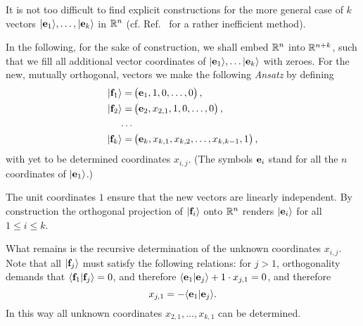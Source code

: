 \documentclass[%
 preprint,
 showpacs,
 showkeys,
 preprintnumbers,
 amsmath,amssymb,
 aps,
  pra,
  longbibliography,
 ]{revtex4-1}
\begin{document}

It is not too difficult to find explicit constructions for the more general
case of $k$ vectors $\vert {\bf e}_1 \rangle , \ldots, \vert {\bf e}_k \rangle
$ in ${\Bbb R}^n$ (cf. Ref.~\cite{svozil-2016-vector} for a rather inefficient
method).

In the following, for the sake of construction, we shall embed ${\Bbb R}^n$
into ${\Bbb R}^{n+k}$, such that we fill all additional vector coordinates of
$\vert {\bf e}_1 \rangle , \ldots \vert {\bf e}_k \rangle $ with zeroes. For
the new, mutually orthogonal, vectors we make the following {\it Ansatz} by
defining
\begin{equation}\label{ansatz}
\begin{aligned}
\vert {\bf f}_1 \rangle =& \begin{pmatrix}{\bf e}_1, 1, 0, \ldots, 0 \end{pmatrix}, \\
\vert {\bf f}_2 \rangle =& \begin{pmatrix}{\bf e}_2, x_{2,1}, 1, 0,\ldots, 0\end{pmatrix},\\
\ldots& \\
\vert {\bf f}_k \rangle =& \begin{pmatrix}{\bf e}_k, x_{k,1}, x_{k,2},\ldots, x_{k,k-1}, 1\end{pmatrix},
\end{aligned}%
\end{equation}
with yet to be determined coordinates $x_{i,j}$.
(The symbols ${\bf e}_i$ stand for all the $n$ coordinates of $\vert {\bf e}_1 \rangle$.)

The unit coordinates $1$ ensure that the new vectors are linearly
independent. By construction the orthogonal projection of $\vert {\bf f}_i
\rangle$ onto ${\Bbb R}^n$ renders $\vert {\bf e}_i \rangle$ for all $1\le i
\le k$.

What remains is the recursive determination of the unknown coordinates $x_{i,j}$.
Note that all  $\vert {\bf f}_j \rangle$ must satisfy the following relations:
for $j > 1$,
orthogonality demands that
$\langle {\bf f}_1 \vert {\bf f}_j \rangle = 0$, and therefore
$\langle {\bf e}_1 \vert {\bf e}_j \rangle + 1 \cdot  x_{j,1} = 0$,
and therefore
\begin{equation}
x_{j,1} = - \langle {\bf e}_1 \vert {\bf e}_j \rangle
.
\end{equation}
In this way all unknown coordinates $x_{2,1}, \ldots , x_{k,1}$ can be determined.
\end{document}
